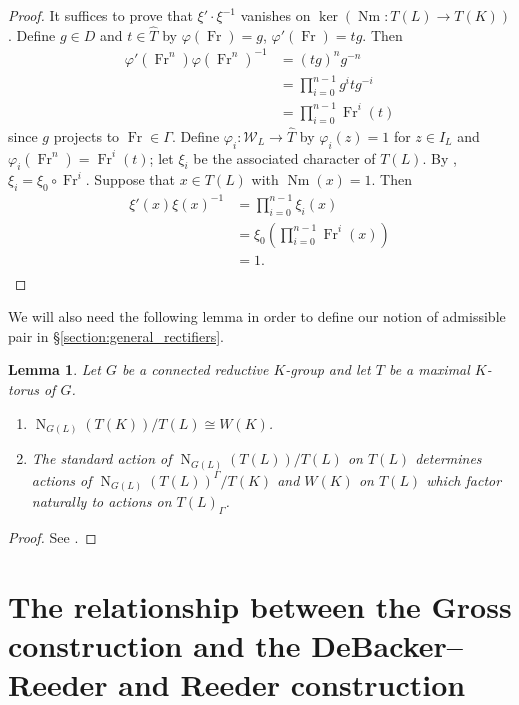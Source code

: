 \documentclass{compositio}
\theoremstyle{plain}
\newtheorem{lemma}[theorem]{Lemma}
\theoremstyle{definition}
\DeclareMathOperator{\Nm}{Nm}
\DeclareMathOperator{\Fr}{Fr}
\newcommand{\Weil}{\mathcal{W}}
\newcommand{\Normalizer}[2]{\operatorname{N}_{#2}(#1)}
\begin{document}
\begin{proof}
It suffices to prove that $\xi' \cdot \xi^{-1}$ vanishes on
$\ker(\Nm : T(L) \rightarrow T(K))$.  Define $g \in D$ and $t \in \hat{T}$ by
$\varphi(\Fr) = g$, $\varphi'(\Fr) = tg$.  Then
\begin{align*}
\varphi'(\Fr^n) \varphi(\Fr^n)^{-1} &= (tg)^n g^{-n} \\
&= \prod_{i=0}^{n-1} g^i t g^{-i} \\
&= \prod_{i=0}^{n-1} \Fr^i(t)
\end{align*}
since $g$ projects to $\Fr \in \Gamma$.  Define $\varphi_i \colon \Weil_L \rightarrow \hat{T}$
by $\varphi_i(z) = 1$ for $z \in I_L$ and
$\varphi_i(\Fr^n) = \Fr^i(t)$; let $\xi_i$ be the associated character
of $T(L)$.  By \cite[Lem. 4.3.1]{reeder-debacker:09a}, $\xi_i = \xi_0 \circ \Fr^i.$
Suppose that $x \in T(L)$ with $\Nm(x) = 1$.  Then
\begin{align*}
\xi'(x) \xi(x)^{-1} &= \prod_{i=0}^{n-1} \xi_i(x) \\
&= \xi_0 \left(\prod_{i=0}^{n-1}\Fr^i(x)\right) \\
&= 1.\\
\end{align*}
\end{proof}

We will also need the following lemma in order to define our notion of admissible pair
in \S\ref{section:general_rectifiers}.

\begin{lemma} \label{lem:weyl_groups}
Let $G$ be a connected reductive $K$-group and let $T$ be a maximal
$K$-torus of $G$.
\begin{enumerate}
\item $\Normalizer{T(K)}{G(L)} / T(L) \cong W(K)$.
\item The standard action of $\Normalizer{T(L)}{G(L)} / T(L)$ on $T(L)$ determines
actions of $\Normalizer{T(L)}{G(L)}^\Gamma / T(K)$ and $W(K)$
on $T(L)$ which factor naturally to actions on $T(L)_\Gamma$.
\end{enumerate}
\end{lemma}

\begin{proof}
See \cite[Lem. 9.1]{adrian-lansky:ppa}.
\end{proof}

\section{The relationship between the Gross construction and the DeBacker--Reeder and Reeder construction}
\label{section:gross_debacker_reeder}
\end{document}
